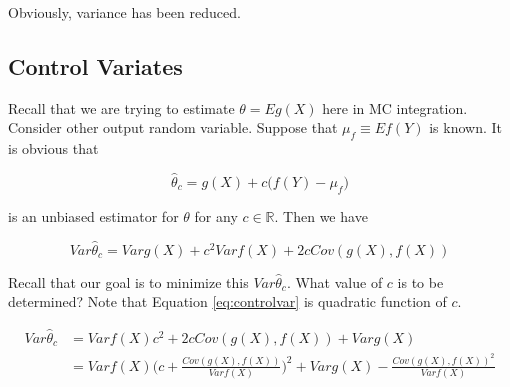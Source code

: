 \documentclass[]{book}
\newenvironment{Shaded}{\begin{snugshade}}{\end{snugshade}}
\newcommand{\CommentTok}[1]{\textcolor[rgb]{0.56,0.35,0.01}{\textit{#1}}}
\newcommand{\DataTypeTok}[1]{\textcolor[rgb]{0.13,0.29,0.53}{#1}}
\newcommand{\KeywordTok}[1]{\textcolor[rgb]{0.13,0.29,0.53}{\textbf{#1}}}
\newcommand{\NormalTok}[1]{#1}
\newcommand{\OperatorTok}[1]{\textcolor[rgb]{0.81,0.36,0.00}{\textbf{#1}}}
\newcommand{\StringTok}[1]{\textcolor[rgb]{0.31,0.60,0.02}{#1}}
\theoremstyle{definition}
\theoremstyle{definition}
\theoremstyle{definition}
\theoremstyle{remark}
\begin{document}
Obviously, variance has been reduced.

\begin{Shaded}
\end{Shaded}

\hypertarget{control-variates}{%
\subsection{Control Variates}\label{control-variates}}

Recall that we are trying to estimate \(\theta = Eg(X)\) here in MC integration. Consider other output random variable. Suppose that \(\mu_f \equiv Ef(Y)\) is known. It is obvious that

\begin{equation}
  \hat\theta_c = g(X) + c\Big(f(Y) - \mu_f\Big)
  \label{eq:controlest}
\end{equation}

is an unbiased estimator for \(\theta\) for any \(c \in \mathbb{R}\). Then we have

\begin{equation}
  Var\hat\theta_c = Varg(X) + c^2 Varf(X) + 2cCov(g(X), f(X))
  \label{eq:controlvar}
\end{equation}

Recall that our goal is to minimize this \(Var\hat\theta_c\). What value of \(c\) is to be determined? Note that Equation \eqref{eq:controlvar} is quadratic function of \(c\).

\begin{equation}
  \begin{split}
    Var\hat\theta_c & = Varf(X) c^2 + 2cCov(g(X), f(X)) + Varg(X) \\
    & = Var f(X) \bigg( c + \frac{Cov(g(X), f(X))}{Var f(X)} \bigg)^2 + Var g(X) - \frac{Cov(g(X), f(X))^2}{Var f(X)}
  \end{split}
  \label{eq:controlc}
\end{equation}
\end{document}
